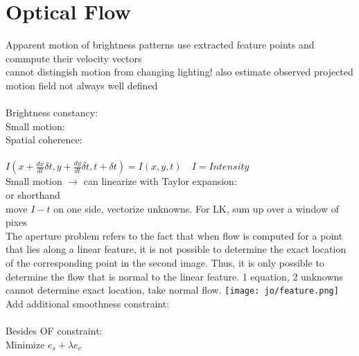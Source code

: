 \section{Optical Flow}
Apparent motion of brightness patterns use extracted feature points and commpute their velocity vectors \\
 cannot distingish motion from changing lighting! also estimate observed projected motion field  not always well defined \\
 \\
Brightness constancy: \\
Small motion: \\
Spatial coherence: \\
\\
$I(x + \frac{dx}{dt}\delta t, y + \frac{dy}{dt} \delta t, t + \delta t) = I(x, y, t)
 \quad I = Intensity$\\
Small motion $\rightarrow$ can linearize with Taylor expansion:\\
 or shorthand \\
move $I-t$ on one side, vectorize unknowns. For LK, sum up over a window of pixes\\
 The aperture problem refers to the fact that when flow is computed for a point that lies along a linear feature, it is not possible to determine the exact location of the corresponding point in the second image. Thus, it is only possible to determine the flow that is normal to the linear feature. 1 equation, 2 unknowns cannot determine exact location, take normal flow. \texttt{[image: jo/feature.png]}\\
Add additional smoothness constraint: \\
\\
Besides OF constraint: \\
 Minimize $e_s + \lambda e_c$
